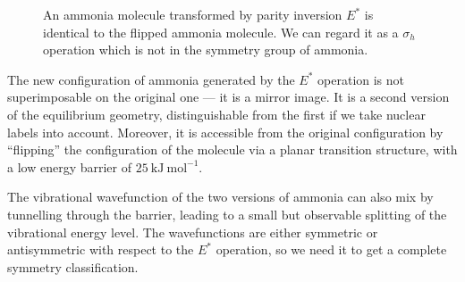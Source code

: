 \documentclass{article}
\theoremstyle{plain}\theoremheaderfont{\normalfont\itshape}\theorembodyfont{\rmfamily}\theoremseparator{.}\newtheorem*{rem}{Remark}\newtheorem*{ex}{Example}\newtheorem*{proof}{Proof}\newtheorem*{altp}{Alternative proof}
\theoremstyle{plain}\theoremheaderfont{\normalfont\bfseries}\theorembodyfont{\rmfamily}\theoremseparator{.}\newtheorem{thm}{Theorem}[section]\newtheorem{lem}[thm]{Lemma}\newtheorem{prop}[thm]{Proposition}\newtheorem*{cor}{Corollary}\newtheorem{defn}[thm]{Definition}\newtheorem{clm}[thm]{Claim}\newtheorem{clminproof}{Claim}\newtheorem*{law}{Law}\newtheorem{pos}[thm]{Postulate}
\theoremstyle{break}\theoremheaderfont{\normalfont\itshape}\theorembodyfont{\rmfamily}\theoremseparator{.\medskip}\newtheorem*{proofskip}{Proof}\newtheorem*{exs}{Examples}\newtheorem*{rems}{Remarks}
\theoremstyle{break}\theoremheaderfont{\normalfont\bfseries}\theorembodyfont{\rmfamily}\theoremseparator{.\medskip}\newtheorem{lemskip}[thm]{Lemma}\newtheorem{defnskip}[thm]{Definition}\newtheorem{propskip}[thm]{Proposition}\newtheorem{thmskip}[thm]{Theorem}
\numberwithin{equation}{section}
\newcommand{\unit}[1]{\ \mathrm{#1}}
\begin{document}
\begin{figure}[ht!]
        \caption{An ammonia molecule transformed by parity inversion \(E^*\) is identical to the flipped ammonia molecule. We can regard it as a \(\sigma_h\) operation which is not in the symmetry group of ammonia.}
    \end{figure}

    The new configuration of ammonia generated by the \(E^*\) operation is not superimposable on the original one --- it is a mirror image. It is a second version of the equilibrium geometry, distinguishable from the first if we take nuclear labels into account. Moreover, it is accessible from the original configuration by ``flipping'' the configuration of the molecule via a planar transition structure, with a low energy barrier of \(25\unit{kJ}\unit{mol}^{-1}\).

    The vibrational wavefunction of the two versions of ammonia can also mix by tunnelling through the barrier, leading to a small but observable splitting of the vibrational energy level. The wavefunctions are either symmetric or antisymmetric with respect to the \(E^*\) operation, so we need it to get a complete symmetry classification.
\end{document}
